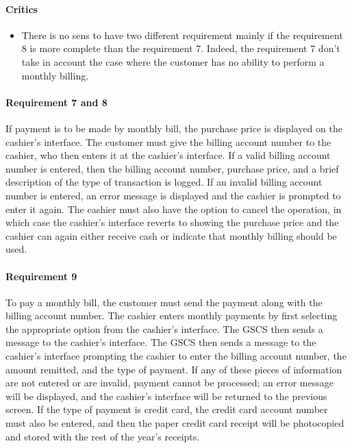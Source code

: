 \documentclass[11pt, a4paper]{article}
\begin{document}
\begin{framed}
    \paragraph{Critics} 
    \begin{itemize}
        \item There is no sens to have two different requirement mainly
            if the requirement 8 is more complete than the requirement
            7. Indeed, the requirement 7 don't take in account the
            case where the customer has no ability to perform a
            monthly billing.
    \end{itemize}

    \paragraph{Requirement 7 and 8} If payment is to be made by monthly bill, the
    purchase price is displayed on the cashier's interface.
    The customer must give the billing account number
    to the cashier, who then enters it at the cashier's interface. If a valid
    billing account number is entered, then the billing account number, purchase
    price, and a brief description of the type of transaction is logged. If an
    invalid billing account number is entered, an error message is displayed
    and the cashier is prompted to enter it again. The cashier must also have
    the option to cancel the operation, in which case the cashier's interface
    reverts to showing the purchase price and the cashier can again either
    receive cash or indicate that monthly billing should be used.
\end{framed}

\paragraph{Requirement 9} To pay a monthly bill, the customer must send
the payment along with the billing account number. The cashier enters
monthly payments by first selecting the appropriate option from the
cashier's interface. The GSCS then sends a message to the cashier's
interface. The GSCS then sends a message to the cashier's interface
prompting the cashier to enter the billing account number, the amount
remitted, and the type of payment. If any of these pieces of information
are not entered or are invalid, payment cannot be processed; an error
message will be displayed, and the cashier's interface will be returned
to the previous screen. If the type of payment is credit card, the credit
card account number must also be entered, and then the paper credit card
receipt will be photocopied and stored with the rest of the year's receipts.
\end{document}
